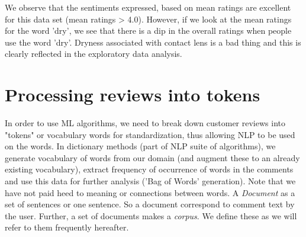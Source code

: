 \documentclass[11pt, letterpaper]{article}
\begin{document}
We observe that the sentiments expressed, based on mean ratings are excellent for this data set (mean ratings > 4.0). However, if we look at the mean ratings for the word 'dry', we see that there is a dip in the overall ratings when people use the word 'dry'. Dryness associated with contact lens is a bad thing and this is clearly reflected in the exploratory data analysis. 

\section{Processing reviews into tokens}
In order to use ML algorithms, we need to break down customer reviews into "tokens" or vocabulary words for standardization, thus allowing NLP to be used on the words. In dictionary methods (part of NLP suite of algorithms), we generate vocabulary of words from our domain (and augment these to an already existing vocabulary), extract frequency of occurrence of words in the comments and use this data for further analysis ('Bag of Words' generation). Note that we have not paid heed to meaning or connections between words. A \textit{Document} as a set of sentences or one sentence. So a document correspond to comment text by the user. Further, a set of documents makes a \textit{corpus}. We define these as we will refer to them frequently hereafter.
\end{document}
